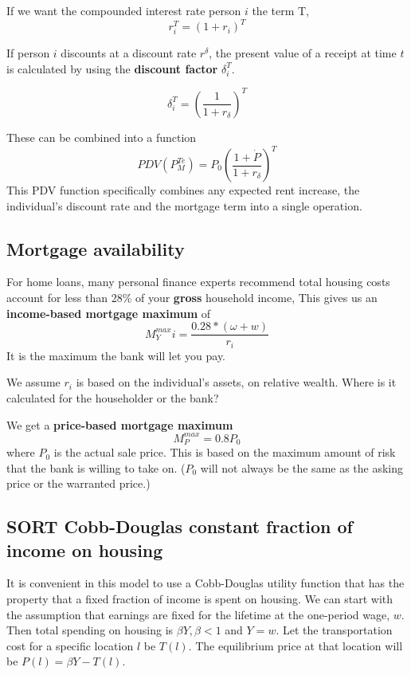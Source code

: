 If we want the compounded interest rate person $i$ the term T,
\[r_i^T=(1+r_i)^T\]

If person $i$  discounts at a discount rate $r^\delta$, the present value of a receipt at time $t$ is calculated by using the \textbf{discount factor} $\delta_i^T$.

\[\delta_i^T= \left( \frac{1}{1+r_\delta} \right)^T \]
 
These can be combined into a function %
\[ PDV(P_M^{Te})=P_0\left( \frac{1+\dot P}{1+r_\delta} \right)^T \]
This PDV function specifically combines any expected rent increase, the individual's discount rate and the mortgage term into a single operation.

\subsection{Mortgage availability}
For home loans, many personal finance experts recommend total housing costs account for less than 28\% of your \textbf{gross} household income, This gives us an \textbf{income-based  mortgage maximum} of \[M^{max}_Yi = \frac{0.28*(\omega+w)}{r_i}\] It is the maximum the bank will let you pay.

We assume $r_i$ is based on the individual's assets, on relative wealth. Where is it calculated for the householder or the bank?

We get a \textbf{price-based mortgage maximum} \[M^{max}_P = 0.8P_0\] where $P_0$ is the actual sale price. This is based on the maximum amount of risk that the bank is willing to take on. ($P_0$  will not always be the same as the asking price or the warranted price.)

\subsection{SORT Cobb-Douglas constant fraction of income on housing}
It is convenient in this model to use a \gls{Cobb-Douglas} utility function that has the property that a fixed fraction of income is spent on housing.  We can start with the assumption that earnings are fixed for the lifetime at the one-period wage, $w$. Then total spending on housing is $\beta Y, \beta <1$ and $ Y=w$. Let the transportation cost for a specific location $l$ be $T(l)$. The  equilibrium price at that location will be $P(l)= \beta Y-T(l)$.

